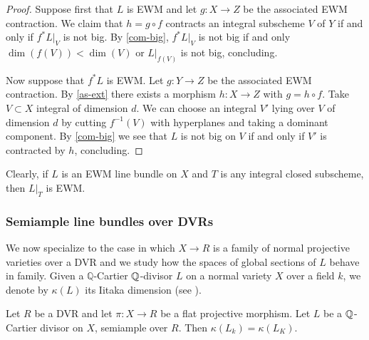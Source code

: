 \begin{proof}
	Suppose first that $L$ is EWM and let $g \colon X \to Z$ be the associated EWM contraction. 	
	We claim that $h=g \circ f$ contracts an integral subscheme $V$ of $Y$ if and only if $f^{*}L|_{V}$ is not big. 	
	By \autoref{com-big}, $f^{*}L|_{V}$ is not big if and only $\dim (f(V))< \dim (V)$ or $L|_{f(V)}$ is not big, concluding. %
	
	Now suppose that $f^{*}L$ is EWM. Let $g \colon Y \to Z$ be the associated EWM contraction. 
	By \autoref{as-ext} there exists a morphism $h \colon X \to Z$ with $g=h\circ f$. 
	Take $V\subset X$ integral of dimension $d$. We can choose an integral $V'$ lying over $V$ of dimension $d$ by cutting $f^{-1}(V)$ with hyperplanes and taking a dominant component. 
	By \autoref{com-big} we see that $L$ is not big on $V$ if and only if $V'$ is contracted by $h$, concluding.
\end{proof}

\begin{remark}
	Clearly, if $L$ is an EWM line bundle on $X$ and $T$ is any integral closed subscheme, then $L|_{T}$ is EWM.    
\end{remark}

	\subsubsection{Semiample line bundles over DVRs}
	We now specialize to the case in which $X\to R$ is a family of normal projective varieties over a DVR and we study how the spaces of global sections of $L$ behave in family. Given a $\mathbb{Q}$-Cartier $\mathbb{Q}$-divisor $L$ on a normal variety $X$ over a field $k$, we denote by $\kappa(L)$ its Iitaka dimension (see \cite[Definition 2.1.3]{La1}).
	
	\begin{lemma}\label{lemma_DIOK}
		Let $R$ be a DVR and let $\pi \colon X\to R$ be a flat projective morphism. 
		Let $L$ be a $\mathbb{Q}$-Cartier divisor on $X$, semiample over $R$. 
		Then $\kappa(L_k)=\kappa(L_K)$.
	\end{lemma}
	
